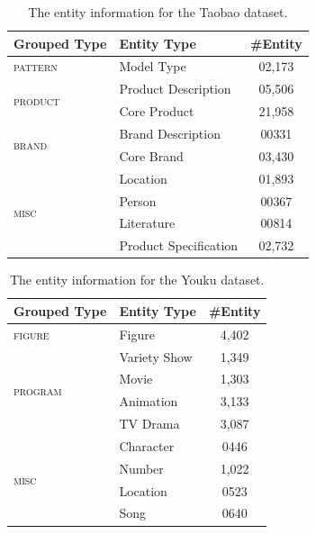 \begin{table}[h!]
	\centering
	\begin{tabular}{llc}
		\toprule 
		{\bf Grouped Type}& {\bf Entity Type}& {\bf \#Entity}  \\\midrule\midrule 
		\textsc{pattern}& Model Type	&	{\color{white}0}2,173 \\
		\midrule
		\multirow{2}{*}{\textsc{product}}&Product Description	&{\color{white}0}5,506	\\
		&Core Product	&21,958	\\	
		\midrule 
		\multirow{2}{*}{\textsc{brand}} & Brand Description	&{\color{white}00}331	\\
		
		&Core Brand	&{\color{white}0}3,430	\\\midrule 
		\multirow{4}{*}{\textsc{misc}}& Location	&{\color{white}0}1,893\\
		&Person	&{\color{white}00}367\\
		&Literature	&{\color{white}00}814\\
		&Product Specification &{\color{white}0}2,732		\\ 
		\bottomrule 
	\end{tabular}
	\caption{The entity information for the Taobao dataset. }
	\label{tab:taobaodata}
\end{table}

\begin{table}[h!]
	\centering
	\begin{tabular}{llc}
		\toprule
		{\bf Grouped Type}& {\bf Entity Type}& {\bf \#Entity}  \\\midrule \midrule 
		\textsc{figure}& Figure	&	4,402 \\
		\midrule 
		\multirow{4}{*}{\textsc{program}}&Variety Show	&1,349	\\
		&Movie	&1,303	\\	
		& Animation	&3,133	\\
		
		&TV Drama	& 3,087	\\\midrule 
		\multirow{4}{*}{\textsc{misc}}& Character	&{\color{white}0}446\\
		&Number	&1,022\\
		&Location	&{\color{white}0}523\\
		&Song &{\color{white}0}640		\\ 
		\bottomrule 
	\end{tabular}
	\caption{The entity information for the Youku dataset. }
	\label{tab:youkudata}
\end{table}


